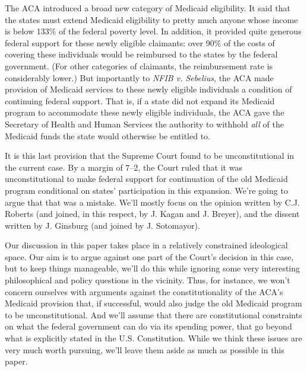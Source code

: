 \documentclass[
  11pt,
  letterpaper,
  DIV=11,
  numbers=noendperiod,
  oneside]{scrartcl}
\begin{document}
The ACA introduced a broad new category of Medicaid eligibility. It said
that the states must extend Medicaid eligibility to pretty much anyone
whose income is below 133\% of the federal poverty level. In addition, it provided quite
generous federal support for these newly eligible claimants: over 90\%
of the costs of covering these individuals would be reimbursed to the
states by the federal government. (For other categories of
claimants, the reimbursement rate is considerably lower.) But
importantly to \emph{NFIB v. Sebelius}, the ACA made provision of
Medicaid services to these newly eligible individuals a condition of
continuing federal support. That is, if a state did not expand its
Medicaid program to accommodate these newly eligible individuals, the
ACA gave the Secretary of Health and Human Services the authority to
withhold \emph{all} of the Medicaid funds the state would otherwise be
entitled to.

It is this last provision that the Supreme Court found to be
unconstitutional in the current case. By a margin of 7--2, the Court
ruled that it was unconstitutional to make federal support for
continuation of the old Medicaid program conditional on states'
participation in this expansion. We're going to argue that that was a
mistake. We'll mostly focus on the opinion written by C.J. Roberts (and
joined, in this respect, by J. Kagan and J. Breyer), and the dissent
written by J. Ginsburg (and joined by J. Sotomayor).

Our discussion in this paper takes place in a relatively constrained
ideological space. Our aim is to argue against one part of the Court's
decision in this case, but to keep things manageable, we'll do this
while ignoring some very interesting philosophical and policy questions
in the vicinity. Thus, for instance, we won't concern ourselves with
arguments against the constitutionality of the ACA's Medicaid provision
that, if successful, would also judge the old Medicaid program to be
unconstitutional. And we'll assume that there are constitutional
constraints on what the federal government can do via its spending
power, that go beyond what is explicitly stated in the U.S.
Constitution. While we think these issues are very much worth pursuing,
we'll leave them aside as much as possible in this paper.
\end{document}
